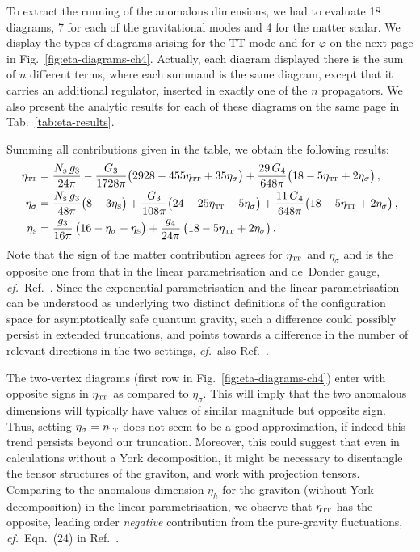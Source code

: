 \documentclass[11pt]{book}
\newcommand\TTspace{ -1pt }
\newcommand\etaTT{ \eta_{\scriptscriptstyle{\mathrm{T\hspace{\TTspace}T}}} }
\newcommand\etaS{ \eta_{\scriptscriptstyle{\mathrm{S}}} }
\newcommand\NS{ N_{\scriptscriptstyle{\mathrm{S}}} }
\newcommand\cf{\textit{cf.}\ }
\numberwithin{equation}{chapter}
\begin{document}
To extract the running of the anomalous dimensions, we had to evaluate 18 diagrams, 7 for
each of the gravitational modes and 4 for the matter scalar. We display the types of
diagrams arising for the $\mathrm{TT}$ mode and for $\varphi$ on the next page in
Fig.~\ref{fig:eta-diagrams-ch4}.
Actually, each diagram displayed there is the sum of $n$ different terms,
where each summand is the same diagram, except that it carries an additional regulator,
inserted in exactly one of the $n$ propagators. We also present the analytic results for
each of these diagrams on the same page in Tab.~\ref{tab:eta-results}.

Summing all contributions given in the table, we obtain the following results:
\begin{align}
  \etaTT      &= \frac{\NS \, g_3}{24 \pi} - \frac{G_3}{1728 \pi} \big( 2928 - 455 \etaTT + 35 \eta_\sigma \big)
  + \frac{29 \, G_4}{648 \pi} \big( 18 - 5 \etaTT + 2 \eta_\sigma \big) \,,
  \label{etaTTcomplete} \\
  \eta_\sigma &= \frac{\NS \, g_3}{48 \pi} \big( 8-3 \etaS \big) + \frac{G_3}{108 \pi} \big( 24 - 25\etaTT - 5 \eta_\sigma \big)
   +\frac{11 \, G_4}{648 \pi} \big( 18 - 5 \etaTT + 2 \eta_\sigma \big) \,,
  \label{etasigmacomplete} \\
  \etaS &= \frac{g_3}{16\pi} \, \big(16-\eta_{\sigma}-\etaS \big)
  + \frac{g_4}{24 \pi} \, \big( 18 - 5 \etaTT + 2 \eta_{\sigma} \big) \,.
\end{align}
Note that the sign of the matter contribution agrees for $\etaTT$ and $\eta_\sigma$
and is the opposite one from that in the linear parametrisation and de~Donder gauge,
\cf Ref.~\cite{Dona:2013qba}. Since the exponential parametrisation and the linear parametrisation
can be understood as underlying two distinct definitions of the configuration space for
asymptotically safe quantum gravity, such a difference could possibly persist in extended truncations,
and points towards a difference in the number of relevant directions in the two settings,
\cf also Ref.~\cite{Ohta:2015efa}.

The two-vertex diagrams (first row in Fig.~\ref{fig:eta-diagrams-ch4})
enter with opposite signs in $\etaTT$ as compared to $\eta_\sigma$.
This will imply that the two anomalous dimensions will typically have values of similar magnitude
but opposite sign. Thus, setting $\eta_\sigma = \etaTT$ does not seem to be a good approximation,
if indeed this trend persists beyond our truncation.
Moreover, this could suggest that even in calculations without a York decomposition,
it might be necessary to disentangle the tensor structures of the graviton,
and work with projection tensors.
Comparing to the anomalous dimension $\eta_h$ for the graviton (without York decomposition)
in the linear parametrisation, we observe that $\etaTT$ has the opposite,
leading order \emph{negative} contribution from the pure-gravity fluctuations,
\cf Eqn.~(24) in Ref.~\cite{Dona:2013qba}.
\end{document}
